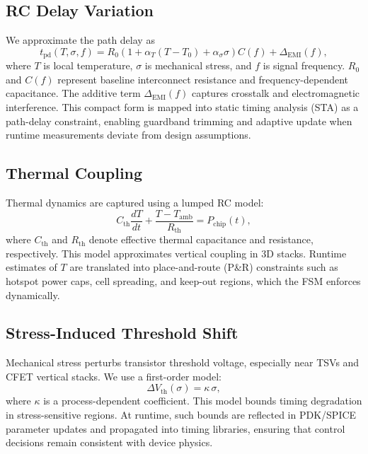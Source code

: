\documentclass[conference]{IEEEtran}
\begin{document}
\subsection{RC Delay Variation}
We approximate the path delay as
\begin{equation}
t_{\mathrm{pd}}(T,\sigma,f)=
R_0\!\left(1+\alpha_T(T-T_0)+\alpha_\sigma\sigma\right)C(f)+\Delta_{\mathrm{EMI}}(f),
\label{eq:rc}
\end{equation}
where $T$ is local temperature, $\sigma$ is mechanical stress, and $f$ is signal frequency. $R_0$ and $C(f)$ represent baseline interconnect resistance and frequency-dependent capacitance. The additive term $\Delta_{\mathrm{EMI}}(f)$ captures crosstalk and electromagnetic interference.  
This compact form is mapped into static timing analysis (STA) as a path-delay constraint, enabling guardband trimming and adaptive update when runtime measurements deviate from design assumptions.

\subsection{Thermal Coupling}
Thermal dynamics are captured using a lumped RC model:
\begin{equation}
C_{\mathrm{th}}\frac{dT}{dt}+\frac{T-T_{\mathrm{amb}}}{R_{\mathrm{th}}}=P_{\mathrm{chip}}(t),
\label{eq:thermal}
\end{equation}
where $C_{\mathrm{th}}$ and $R_{\mathrm{th}}$ denote effective thermal capacitance and resistance, respectively. This model approximates vertical coupling in 3D stacks. Runtime estimates of $T$ are translated into place-and-route (P\&R) constraints such as hotspot power caps, cell spreading, and keep-out regions, which the FSM enforces dynamically.

\subsection{Stress-Induced Threshold Shift}
Mechanical stress perturbs transistor threshold voltage, especially near TSVs and CFET vertical stacks. We use a first-order model:
\begin{equation}
\Delta V_{\mathrm{th}}(\sigma)=\kappa\,\sigma,
\end{equation}
where $\kappa$ is a process-dependent coefficient. This model bounds timing degradation in stress-sensitive regions. At runtime, such bounds are reflected in PDK/SPICE parameter updates and propagated into timing libraries, ensuring that control decisions remain consistent with device physics.
\end{document}
